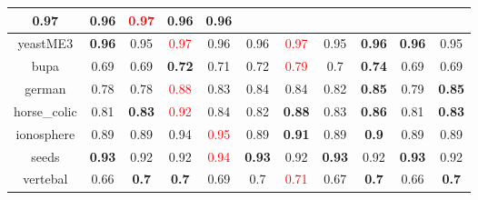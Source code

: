 \documentclass{article}%
\begin{document}
\begin{tabular}{c|cccccccccc}
{0.97
}&0.96&\textcolor{red}{ 
0.97
}&0.96&0.96\\%
\hline%
yeastME3&\textbf{0.96}&0.95&\textcolor{red}{ 
0.97
}&0.96&0.96&\textcolor{red}{ 
0.97
}&0.95&\textbf{0.96}&\textbf{0.96}&0.95\\%
\hline%
bupa&0.69&0.69&\textbf{0.72}&0.71&0.72&\textcolor{red}{ 
0.79
}&0.7&\textbf{0.74}&0.69&0.69\\%
\hline%
german&0.78&0.78&\textcolor{red}{ 
0.88
}&0.83&0.84&0.84&0.82&\textbf{0.85}&0.79&\textbf{0.85}\\%
\hline%
horse\_colic&0.81&\textbf{0.83}&\textcolor{red}{ 
0.92
}&0.84&0.82&\textbf{0.88}&0.83&\textbf{0.86}&0.81&\textbf{0.83}\\%
\hline%
ionosphere&0.89&0.89&0.94&\textcolor{red}{ 
0.95
}&0.89&\textbf{0.91}&0.89&\textbf{0.9}&0.89&0.89\\%
\hline%
seeds&\textbf{0.93}&0.92&0.92&\textcolor{red}{ 
0.94
}&\textbf{0.93}&0.92&\textbf{0.93}&0.92&\textbf{0.93}&0.92\\%
\hline%
vertebal&0.66&\textbf{0.7}&\textbf{0.7}&0.69&0.7&\textcolor{red}{ 
0.71
}&0.67&\textbf{0.7}&0.66&\textbf{0.7}\\%
\hline%
\end{tabular}

%
\end{document}
